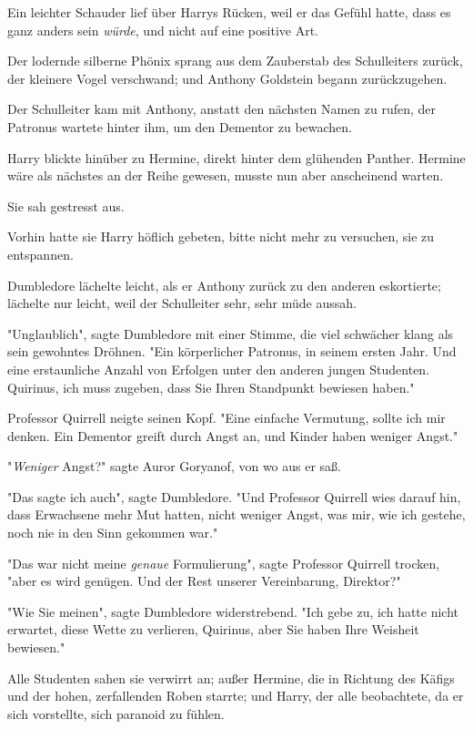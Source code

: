 {Ein leichter Schauder lief über Harrys Rücken, weil er das Gefühl hatte, dass es ganz anders sein \emph{würde}, und nicht auf eine positive Art.

Der lodernde silberne Phönix sprang aus dem Zauberstab des Schulleiters zurück, der kleinere Vogel verschwand; und Anthony Goldstein begann zurückzugehen.

Der Schulleiter kam mit Anthony, anstatt den nächsten Namen zu rufen, der Patronus wartete hinter ihm, um den Dementor zu bewachen.

Harry blickte hinüber zu Hermine, direkt hinter dem glühenden Panther. Hermine wäre als nächstes an der Reihe gewesen, musste nun aber anscheinend warten.

Sie sah gestresst aus.

Vorhin hatte sie Harry höflich gebeten, bitte nicht mehr zu versuchen, sie zu entspannen.

Dumbledore lächelte leicht, als er Anthony zurück zu den anderen eskortierte; lächelte nur leicht, weil der Schulleiter sehr, sehr müde aussah.

"Unglaublich", sagte Dumbledore mit einer Stimme, die viel schwächer klang als sein gewohntes Dröhnen. "Ein körperlicher Patronus, in seinem ersten Jahr. Und eine erstaunliche Anzahl von Erfolgen unter den anderen jungen Studenten. Quirinus, ich muss zugeben, dass Sie Ihren Standpunkt bewiesen haben."

Professor Quirrell neigte seinen Kopf. "Eine einfache Vermutung, sollte ich mir denken. Ein Dementor greift durch Angst an, und Kinder haben weniger Angst."

"\emph{Weniger} Angst?" sagte Auror Goryanof, von wo aus er saß.

"Das sagte ich auch", sagte Dumbledore. "Und Professor Quirrell wies darauf hin, dass Erwachsene mehr Mut hatten, nicht weniger Angst, was mir, wie ich gestehe, noch nie in den Sinn gekommen war."

"Das war nicht meine \emph{genaue} Formulierung", sagte Professor Quirrell trocken, "aber es wird genügen. Und der Rest unserer Vereinbarung, Direktor?"

"Wie Sie meinen", sagte Dumbledore widerstrebend. "Ich gebe zu, ich hatte nicht erwartet, diese Wette zu verlieren, Quirinus, aber Sie haben Ihre Weisheit bewiesen."

Alle Studenten sahen sie verwirrt an; außer Hermine, die in Richtung des Käfigs und der hohen, zerfallenden Roben starrte; und Harry, der alle beobachtete, da er sich vorstellte, sich paranoid zu fühlen.

}
